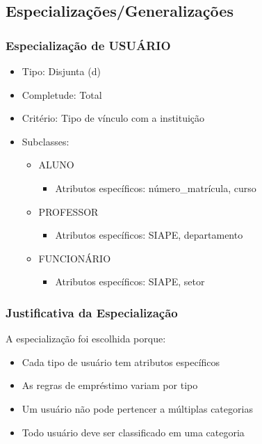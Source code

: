 \documentclass[12pt,a4paper]{article}
\begin{document}
\subsection{Especializações/Generalizações}
\begin{tcolorbox}[title=Hierarquia de Especialização]

\subsubsection{Especialização de USUÁRIO}
\begin{itemize}
    \item Tipo: Disjunta (d)
    \item Completude: Total
    \item Critério: Tipo de vínculo com a instituição
    \item Subclasses:
    \begin{itemize}
        \item ALUNO
        \begin{itemize}
            \item Atributos específicos: número\_matrícula, curso
        \end{itemize}
        \item PROFESSOR
        \begin{itemize}
            \item Atributos específicos: SIAPE, departamento
        \end{itemize}
        \item FUNCIONÁRIO
        \begin{itemize}
            \item Atributos específicos: SIAPE, setor
        \end{itemize}
    \end{itemize}
\end{itemize}

\subsubsection{Justificativa da Especialização}
A especialização foi escolhida porque:
\begin{itemize}
    \item Cada tipo de usuário tem atributos específicos
    \item As regras de empréstimo variam por tipo
    \item Um usuário não pode pertencer a múltiplas categorias
    \item Todo usuário deve ser classificado em uma categoria
\end{itemize}


\end{tcolorbox}
\end{document}
